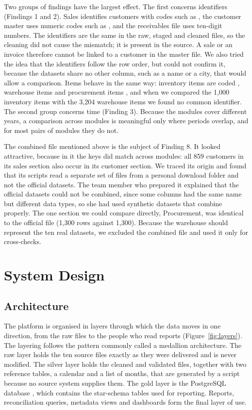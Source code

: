 \documentclass[12pt,a4paper]{report}
\newcommand{\code}[1]{\path{#1}}
\begin{document}
Two groups of findings have the largest effect. The first concerns identifiers (Findings 1 and 2). Sales identifies customers with codes such as \code{CUST001}, the customer master uses numeric codes such as \code{5001}, and the receivables file uses ten-digit numbers. The identifiers are the same in the raw, staged and cleaned files, so the cleaning did not cause the mismatch; it is present in the source. A sale or an invoice therefore cannot be linked to a customer in the master file. We also tried the idea that the identifiers follow the row order, but could not confirm it, because the datasets share no other column, such as a name or a city, that would allow a comparison. Items behave in the same way: inventory items are coded \code{ITM_001}, warehouse items \code{ITM10000} and procurement items \code{P109}, and when we compared the 1,000 inventory items with the 3,204 warehouse items we found no common identifier. The second group concerns time (Finding 3). Because the modules cover different years, a comparison across modules is meaningful only where periods overlap, and for most pairs of modules they do not.

The combined file mentioned above is the subject of Finding 8. It looked attractive, because in it the keys did match across modules: all 859 customers in its sales section also occur in its customer section. We traced its origin and found that its scripts read a separate set of files from a personal download folder and not the official datasets. The team member who prepared it explained that the official datasets could not be combined, since some columns had the same name but different data types, so she had used synthetic datasets that combine properly. The one section we could compare directly, Procurement, was identical to the official file (1,300 rows against 1,300). Because the warehouse should represent the ten real datasets, we excluded the combined file and used it only for cross-checks.

\chapter{System Design}\label{ch:design}

\section{Architecture}
The platform is organised in layers through which the data moves in one direction, from the raw files to the people who read reports (Figure~\ref{fig:layers}). The layering follows the pattern commonly called a medallion architecture. The raw layer holds the ten source files exactly as they were delivered and is never modified. The silver layer holds the cleaned and validated files, together with two reference tables, a calendar and a list of months, that are generated by a script because no source system supplies them. The gold layer is the PostgreSQL database \code{uc15_dw}, which contains the star-schema tables used for reporting. Reports, reconciliation queries, metadata views and dashboards form the final layer of use.
\end{document}
